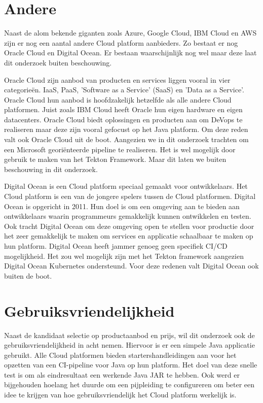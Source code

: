 \section{Andere}
\label{sec:oracledigitalocean}
Naast de alom bekende giganten zoals Azure, Google Cloud, IBM Cloud en AWS zijn er nog een aantal andere Cloud platform aanbieders. Zo bestaat er nog Oracle Cloud en Digital Ocean. Er bestaan waarschijnlijk nog wel maar deze laat dit onderzoek buiten beschouwing.

Oracle Cloud zijn aanbod van producten en services liggen vooral in vier categorieën. IaaS, PaaS, 'Software as a Service' (SaaS) en 'Data as a Service'. Oracle Cloud hun aanbod is hoofdzakelijk hetzelfde als alle andere Cloud platformen. Juist zoals IBM Cloud heeft Oracle hun eigen hardware en eigen datacenters. Oracle Cloud biedt oplossingen en producten aan om DeVops te realiseren maar deze zijn vooral gefocust op het Java platform. Om deze reden valt ook Oracle Cloud uit de boot. Aangezien we in dit onderzoek trachten om een Microsoft georiënteerde pipeline te realiseren. Het is wel mogelijk door gebruik te maken van het Tekton Framework. Maar dit laten we buiten beschouwing in dit onderzoek.

Digital Ocean is een Cloud platform speciaal gemaakt voor ontwikkelaars. Het Cloud platform is een van de jongere spelers tussen de Cloud platformen. Digital Ocean is opgericht in 2011. Hun doel is om een omgeving aan te bieden aan ontwikkelaars waarin programmeurs gemakkelijk kunnen ontwikkelen en testen. Ook tracht Digital Ocean om deze omgeving open te stellen voor productie door het zeer gemakkelijk te maken om services en applicatie schaalbaar te maken op hun platform. Digital Ocean heeft jammer genoeg geen specifiek CI/CD mogelijkheid. Het zou wel mogelijk zijn met het Tekton framework aangezien Digital Ocean Kubernetes ondersteund. Voor deze redenen valt Digital Ocean ook buiten de boot.

\section{Gebruiksvriendelijkheid}
\label{sec:KandidaatSelectie}
Naast de kandidaat selectie op productaanbod en prijs, wil dit onderzoek ook de gebruiksvriendelijkheid in acht nemen. Hiervoor is er een simpele Java applicatie gebruikt. Alle Cloud platformen bieden startershandleidingen aan voor het opzetten van een CI-pipeline voor Java op hun platform. Het doel van deze snelle test is om als eindresultaat een werkende Java JAR te hebben. Ook werd er bijgehouden hoelang het duurde om een pijpleiding te configureren om beter een idee te krijgen van hoe gebruiksvriendelijk het Cloud platform werkelijk is. 

